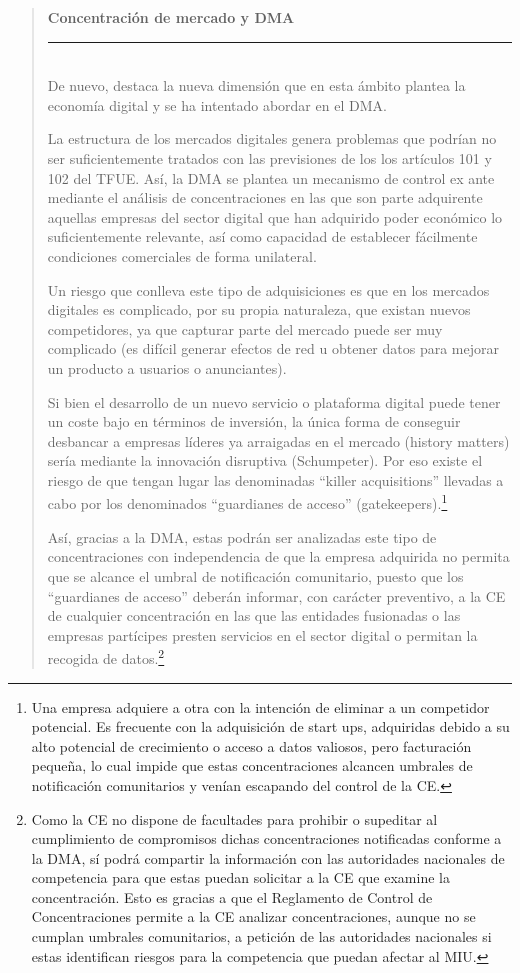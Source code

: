 \documentclass[10pt,a4paper]{article}
\newenvironment{specialblock}[1]{%
      \begin{quote} %
      \small %
      \noindent\textbf{#1}\\[-0.3em] %
      \rule{\linewidth}{0.4pt}\\[0.6em]}{
      \end{quote}}
\begin{document}
\begin{specialblock}{Concentración de mercado y DMA}
    De nuevo, destaca la nueva dimensión que en esta ámbito plantea la economía digital y se ha intentado abordar en el DMA.
    
    La estructura de los mercados digitales genera problemas que podrían no ser suficientemente tratados con las previsiones de los los artículos 101 y 102 del TFUE. Así, la DMA se plantea un mecanismo de control ex ante mediante el análisis de concentraciones en las que son parte adquirente aquellas empresas del sector digital que han adquirido poder económico lo suficientemente relevante, así como capacidad de establecer fácilmente condiciones comerciales de forma unilateral.

    Un riesgo que conlleva este tipo de adquisiciones es que en los mercados digitales es complicado, por su propia naturaleza, que existan nuevos competidores, ya que capturar parte del mercado puede ser muy complicado (es difícil generar efectos de red u obtener datos para mejorar un producto a usuarios o anunciantes).

    Si bien el desarrollo de un nuevo servicio o plataforma digital puede tener un coste bajo en términos de inversión, la única forma de conseguir desbancar a empresas líderes ya arraigadas en el mercado (history matters) sería mediante la innovación disruptiva (Schumpeter). Por eso existe el riesgo de que tengan lugar las denominadas “killer acquisitions” llevadas a cabo por los denominados “guardianes de acceso” (gatekeepers).\footnote{%
        Una empresa adquiere a otra con la intención de eliminar a un competidor potencial. Es frecuente con la adquisición de start ups, adquiridas debido a su alto potencial de crecimiento o acceso a datos valiosos, pero facturación pequeña, lo cual impide que estas concentraciones alcancen umbrales de notificación comunitarios y venían escapando del control de la CE.
    }

    Así, gracias a la DMA, estas podrán ser analizadas este tipo de concentraciones con independencia de que la empresa adquirida no permita que se alcance el umbral de notificación comunitario, puesto que los “guardianes de acceso” deberán informar, con carácter preventivo, a la CE de cualquier concentración en las que las entidades fusionadas o las empresas partícipes presten servicios en el sector digital o permitan la recogida de datos.\footnote{%
        Como la CE no dispone de facultades para prohibir o supeditar al cumplimiento de compromisos dichas concentraciones notificadas conforme a la DMA, sí podrá compartir la información con las autoridades nacionales de competencia para que estas puedan solicitar a la CE que examine la concentración. Esto es gracias a que el Reglamento de Control de Concentraciones permite a la CE analizar concentraciones, aunque no se cumplan umbrales comunitarios, a petición de las autoridades nacionales si estas identifican riesgos para la competencia que puedan afectar al MIU.
    }


\end{specialblock}
\end{document}
